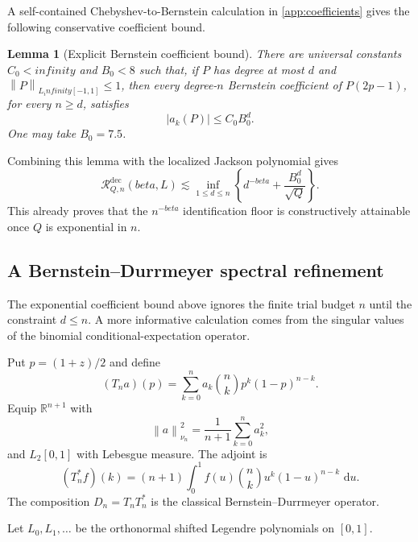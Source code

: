 \documentclass[11pt]{article}
\def\beta{beta}%
\def\infty{infinity}%
\newtheorem{lemma}[theorem]{Lemma}
\newcommand{\R}{\mathbb R}
\newcommand{\calR}{\mathcal R}
\newcommand{\norm}[1]{\left\lVert#1\right\rVert}
\newcommand{\dd}{\,\mathrm d}
\begin{document}
A self-contained Chebyshev-to-Bernstein calculation in \cref{app:coefficients} gives the following conservative coefficient bound.

\begin{lemma}[Explicit Bernstein coefficient bound]
\label{lem:B0}
There are universal constants $C_0<\infty$ and $B_0<8$ such that, if $P$ has degree at most $d$ and $\norm{P}_{L_\infty[-1,1]}\le1$, then every degree-$n$ Bernstein coefficient of $P(2p-1)$, for every $n\ge d$, satisfies
\[
|a_k(P)|\le C_0B_0^d.
\]
One may take $B_0=7.5$.
\end{lemma}

Combining this lemma with the localized Jackson polynomial gives
\begin{equation}
\label{eq:B0-upper}
\calR^{\mathrm{dec}}_{Q,n}(\beta,L)
\lesssim
\inf_{1\le d\le n}
\left\{
 d^{-\beta}+\frac{B_0^d}{\sqrt Q}
\right\}.
\end{equation}
This already proves that the $n^{-\beta}$ identification floor is constructively attainable once $Q$ is exponential in $n$.

\subsection{A Bernstein--Durrmeyer spectral refinement}
\label{sec:durrmeyer}

The exponential coefficient bound above ignores the finite trial budget $n$ until the constraint $d\le n$.  A more informative calculation comes from the singular values of the binomial conditional-expectation operator.

Put $p=(1+z)/2$ and define
\[
(T_na)(p)
=
\sum_{k=0}^n a_k\binom nkp^k(1-p)^{n-k}.
\]
Equip $\R^{n+1}$ with
\[
\norm{a}_{\nu_n}^2
=
\frac1{n+1}\sum_{k=0}^n a_k^2,
\]
and $L_2[0,1]$ with Lebesgue measure.  The adjoint is
\[
(T_n^*f)(k)
=
(n+1)\int_0^1f(u)\binom nk u^k(1-u)^{n-k}\,\dd u.
\]
The composition $D_n=T_nT_n^*$ is the classical Bernstein--Durrmeyer operator.

Let $L_0,L_1,\dots$ be the orthonormal shifted Legendre polynomials on $[0,1]$.
\end{document}
